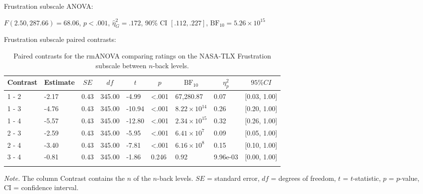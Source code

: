 \documentclass[
  man,floatsintext]{apa6}
\begin{document}
\newpage

Frustration subscale ANOVA:

\(F(2.50, 287.66) = 68.06\), \(p < .001\), \(\hat{\eta}^2_G = .172\), 90\% CI \([.112, .227]\), \(\mathrm{BF}_{\textrm{10}} = 5.26 \times 10^{15}\)

Frustration subscale paired contrasts:

\begin{table}[H]

\begin{center}
\begin{threeparttable}

\caption{\label{tab:unnamed-chunk-8}Paired contrasts for the rmANOVA comparing ratings on the NASA-TLX Frustration subscale between $n$-back levels.}

\begin{tabular}{lllllllll}
\toprule
Contrast & \multicolumn{1}{c}{Estimate} & \multicolumn{1}{c}{$SE$} & \multicolumn{1}{c}{$df$} & \multicolumn{1}{c}{$t$} & \multicolumn{1}{c}{$p$} & \multicolumn{1}{c}{$\mathrm{BF}_{\textrm{10}}$} & \multicolumn{1}{c}{$\eta_{p}^{2}$} & \multicolumn{1}{c}{$95\% CI$}\\
\midrule
1 - 2 & -2.17 & 0.43 & 345.00 & -4.99 & <.001 & 67,280.87 & 0.07 & {}[0.03, 1.00]\\
1 - 3 & -4.76 & 0.43 & 345.00 & -10.94 & <.001 & $8.22 \times 10^{14}$ & 0.26 & {}[0.20, 1.00]\\
1 - 4 & -5.57 & 0.43 & 345.00 & -12.80 & <.001 & $2.34 \times 10^{15}$ & 0.32 & {}[0.26, 1.00]\\
2 - 3 & -2.59 & 0.43 & 345.00 & -5.95 & <.001 & $6.41 \times 10^{7}$ & 0.09 & {}[0.05, 1.00]\\
2 - 4 & -3.40 & 0.43 & 345.00 & -7.81 & <.001 & $6.16 \times 10^{8}$ & 0.15 & {}[0.10, 1.00]\\
3 - 4 & -0.81 & 0.43 & 345.00 & -1.86 & 0.246 & 0.92 & 9.96e-03 & {}[0.00, 1.00]\\
\bottomrule
\addlinespace
\end{tabular}

\begin{tablenotes}[para]
\normalsize{\textit{Note.} The column Contrast contains the $n$ of the $n$-back levels. $SE$ = standard error, $df$ = degrees of freedom, $t$ = $t$-statistic, $p$ = $p$-value, CI = confidence interval.}
\end{tablenotes}

\end{threeparttable}
\end{center}

\end{table}
\end{document}
